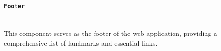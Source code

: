 \paragraph{\texttt{Footer}}  \mbox{}\\


This component serves as the footer of the web application, providing a comprehensive list of landmarks and essential links.



